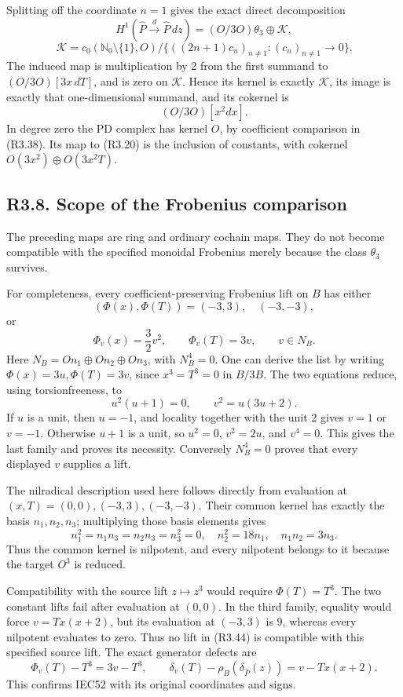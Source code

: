 \documentclass[
]{article}
\begin{document}
Splitting off the coordinate \(n=1\) gives the exact direct
decomposition \[
H^1(\widehat P\xrightarrow d\widehat P\,dz)
=(O/3O)\theta_3\oplus\mathcal K,
\] \[
\mathcal K=
c_0(\mathbb N_0\setminus\{1\},O)\big/
\{((2n+1)c_n)_{n\ne1}:(c_n)_{n\ne1}\to0\}.
\tag{R3.42}
\] The induced map is multiplication by 2 from the first summand to
\((O/3O)[3x\,dT]\), and is zero on \(\mathcal K\). Hence its kernel is
exactly \(\mathcal K\), its image is exactly that one-dimensional
summand, and its cokernel is \[
(O/3O)[x^2dx].
\tag{R3.43}
\] In degree zero the PD complex has kernel \(O\), by coefficient
comparison in (R3.38). Its map to (R3.20) is the inclusion of constants,
with cokernel \(O(3x^2)\oplus O(3x^2T)\).

\subsection{R3.8. Scope of the Frobenius
comparison}\label{r3.8.-scope-of-the-frobenius-comparison}

The preceding maps are ring and ordinary cochain maps. They do not
become compatible with the specified monoidal Frobenius merely because
the class \(\theta_3\) survives.

For completeness, every coefficient-preserving Frobenius lift on \(B\)
has either \[
(\Phi(x),\Phi(T))=(-3,3),\quad(-3,-3),
\] or \[
\Phi_v(x)=\frac32v^2,\qquad \Phi_v(T)=3v,\qquad v\in N_B.
\tag{R3.44}
\] Here \(N_B=On_1\oplus On_2\oplus On_3\), with \(N_B^4=0\). One can
derive the list by writing \(\Phi(x)=3u,\Phi(T)=3v\), since
\(x^3=T^3=0\) in \(B/3B\). The two equations reduce, using
torsionfreeness, to \[
u^2(u+1)=0,\qquad v^2=u(3u+2).
\] If \(u\) is a unit, then \(u=-1\), and locality together with the
unit 2 gives \(v=1\) or \(v=-1\). Otherwise \(u+1\) is a unit, so
\(u^2=0\), \(v^2=2u\), and \(v^4=0\). This gives the last family and
proves its necessity. Conversely \(N_B^4=0\) proves that every displayed
\(v\) supplies a lift.

The nilradical description used here follows directly from evaluation at
\((x,T)=(0,0),(-3,3),(-3,-3)\). Their common kernel has exactly the
basis \(n_1,n_2,n_3\); multiplying those basis elements gives \[
n_1^2=n_1n_3=n_2n_3=n_3^2=0,\quad
n_2^2=18n_1,\quad n_1n_2=3n_3.
\] Thus the common kernel is nilpotent, and every nilpotent belongs to
it because the target \(O^3\) is reduced.

Compatibility with the source lift \(z\mapsto z^3\) would require
\(\Phi(T)=T^3\). The two constant lifts fail after evaluation at
\((0,0)\). In the third family, equality would force \(v=Tx(x+2)\), but
its evaluation at \((-3,3)\) is 9, whereas every nilpotent evaluates to
zero. Thus no lift in (R3.44) is compatible with this specified source
lift. The exact generator defects are \[
\Phi_v(T)-T^3=3v-T^3,\qquad
\delta_v(T)-\rho_B(\delta_{\widehat P}(z))=v-Tx(x+2).
\tag{R3.45}
\] This confirms IEC52 with its original coordinates and signs.
\end{document}
